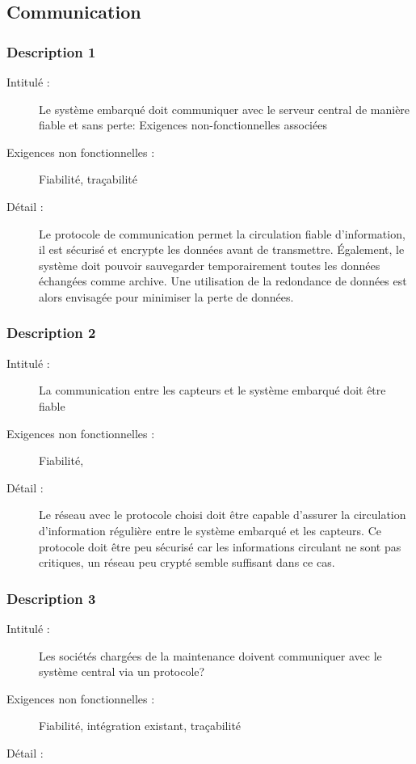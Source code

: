 \subsection {Communication}
\subsubsection {Description 1}
\begin{description}
           \item[Intitulé :] Le système embarqué doit communiquer avec le serveur central de manière fiable et sans perte:
Exigences non-fonctionnelles associées
           \item[Exigences non fonctionnelles :]  Fiabilité, traçabilité 
           \item[Détail :] Le protocole de communication permet la circulation fiable d’information, il est sécurisé et encrypte les données avant de transmettre. Également, le système doit pouvoir sauvegarder temporairement toutes les données échangées comme archive. Une utilisation de la redondance de données est alors envisagée pour minimiser la perte de données.
\end{description}

\subsubsection {Description 2}
\begin{description}
           \item[Intitulé :] La communication entre les capteurs et le système embarqué doit être fiable 
           \item[Exigences non fonctionnelles :] Fiabilité, 
           \item[Détail :] Le réseau avec le protocole choisi doit être capable d’assurer la circulation d’information régulière entre le système embarqué et les capteurs. Ce protocole doit être peu sécurisé car les informations circulant ne sont pas critiques, un réseau peu crypté semble suffisant dans ce cas.
\end{description}

\subsubsection {Description 3}
\begin{description}
           \item[Intitulé :] Les sociétés chargées de la maintenance doivent communiquer avec le système central via un protocole? 
           \item[Exigences non fonctionnelles :] Fiabilité, intégration existant, traçabilité
           \item[Détail :] 
\end{description}

